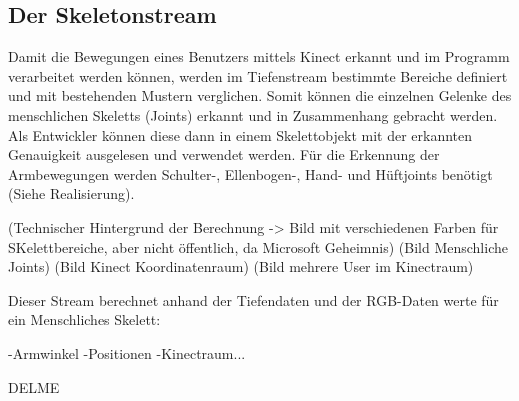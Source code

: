 \subsection{Der Skeletonstream}
Damit die Bewegungen eines Benutzers mittels Kinect erkannt und im Programm verarbeitet werden können, werden im Tiefenstream bestimmte Bereiche definiert und mit bestehenden Mustern verglichen. Somit können die einzelnen Gelenke des menschlichen Skeletts (Joints) erkannt und in Zusammenhang gebracht werden. Als Entwickler können diese dann in einem Skelettobjekt mit der erkannten Genauigkeit ausgelesen und verwendet werden. Für die Erkennung der Armbewegungen werden Schulter-, Ellenbogen-, Hand- und Hüftjoints benötigt (Siehe Realisierung).


(Technischer Hintergrund der Berechnung -> Bild mit verschiedenen Farben für SKelettbereiche, aber nicht öffentlich, da Microsoft Geheimnis)
(Bild Menschliche Joints)
(Bild Kinect Koordinatenraum)
(Bild mehrere User im Kinectraum)




Dieser Stream berechnet anhand der Tiefendaten und der RGB-Daten werte für ein Menschliches Skelett:

-Armwinkel
-Positionen
-Kinectraum...


DELME\cite{hertzberg2009mobile}
